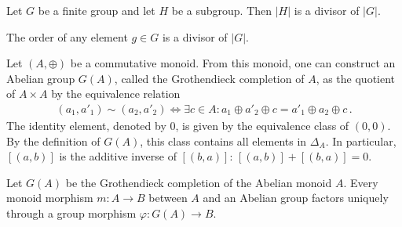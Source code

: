 

    \begin{theorem}[Lagrange]
        Let $G$ be a finite group and let $H$ be a subgroup. Then $|H|$ is a divisor of $|G|$.
    \end{theorem}
    \begin{result}
        The order of any element $g\in G$ is a divisor of $|G|$.
    \end{result}

    \begin{construct}\label{group:grothendieck_completion}
        Let $(A,\oplus)$ be a commutative monoid. From this monoid, one can construct an Abelian group $G(A)$, called the Grothendieck completion of $A$, as the quotient of $A\times A$ by the equivalence relation
        \begin{gather}
            (a_1,a'_1)\sim (a_2,a'_2)\iff\exists c\in A:a_1\oplus a'_2\oplus c = a'_1\oplus a_2\oplus c\,.
        \end{gather}
        The identity element, denoted by 0, is given by the equivalence class of $(0,0)$. By the definition of $G(A)$, this class contains all elements in $\Delta_A$. In particular, $[(a,b)]$ is the additive inverse of $[(b,a)]$: $[(a,b)] + [(b,a)] = 0$.
    \end{construct}
    \begin{uproperty}
        Let $G(A)$ be the Grothendieck completion of the Abelian monoid $A$. Every monoid morphism $m:A\rightarrow B$ between $A$ and an Abelian group factors uniquely through a group morphism $\varphi:G(A)\rightarrow B$.
    \end{uproperty}

